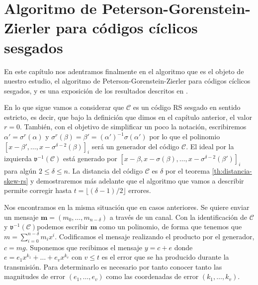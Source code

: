 \chapter{Algoritmo de Peterson-Gorenstein-Zierler para códigos cíclicos sesgados}

En este capítulo nos adentramos finalmente en el algoritmo que es el objeto de nuestro estudio, el algoritmo de Peterson-Gorenstein-Zierler para códigos cíclicos sesgados, y es una exposición de los resultados descritos en \parencite{gomez-torrecillas_petersongorensteinzierler_2018}.

En lo que sigue vamos a considerar que \(\mathcal C\) es un código RS sesgado en sentido estricto, es decir, que bajo la definición que dimos en el capítulo anterior, el valor \(r = 0\).
También, con el objetivo de simplificar un poco la notación, escribiremos \(\alpha' = \sigma^r(\alpha)\) y \(\sigma^r(\beta) = \beta' = (\alpha')^{-1}\sigma(\alpha')\) por lo que el polinomio \([x - \beta', \dots, x - \sigma^{\delta - 2}(\beta)]_i\) será un generador del código \(\mathcal C\).
El ideal por la izquierda \(\mathfrak v^{-1}(\mathcal C)\) está generado por \([x - \beta, x - \sigma(\beta), \dots, x - \sigma^{\delta - 2}(\beta')]_i\) para algún \(2 \leq \delta \leq n\).
La distancia del código \(\mathcal C\) es \(\delta\) por el teorema \ref{th:distancia-skew-rs} y demostraremos más adelante que el algoritmo que vamos a describir permite corregir hasta \(t = \lfloor (\delta - 1)/2 \rfloor\) errores.

Nos encontramos en la misma situación que en casos anteriores.
Se quiere enviar un mensaje \(\mathbf{m} = (m_0, \dots, m_{n - \delta})\) a través de un canal.
Con la identificación de \(\mathcal C\) y \(\mathfrak v^{-1}(\mathcal C)\)podemos escribir \(\mathbf{m}\) como un polinomio, de forma que tenemos que \(m = \sum_{i=0}^{n-\delta}m_ix^{i}\).
Codificamos el mensaje realizando el producto por el generador, \(c = mg\).
Suponemos que recibimos el mensaje \(y = c + e\) donde \(e = e_1x^{k_1} + \dots + e_vx^{k_v}\) con \(v \leq t\) es el error que se ha producido durante la transmisión.
Para determinarlo es necesario por tanto conocer tanto las magnitudes de error \((e_{1}, \dots, e_{v})\) como las coordenadas de error \((k_1, \dots, k_v)\).

